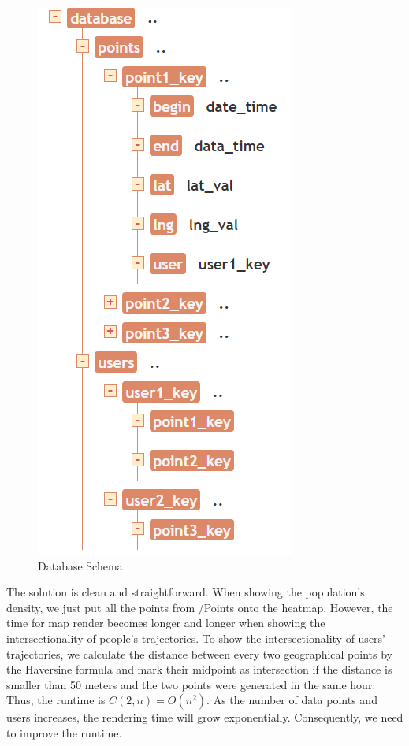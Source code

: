 \documentclass{ucsdreport}
\begin{document}
\begin{figure}[H]
    \includegraphics[scale=0.45]{images/database1.png}
    \caption{Database Schema}
\end{figure}

The solution is clean and straightforward. When showing the population's 
density, we just put all the points from /Points onto the heatmap. However, 
the time for map render becomes longer and longer when showing the 
intersectionality of people's trajectories. To show the intersectionality of 
users' trajectories, we calculate the distance between every two geographical 
points by the Haversine formula and mark their midpoint as intersection if the 
distance is smaller than 50 meters and the two points were generated in the 
same hour. Thus, the runtime is $C(2, n) = O(n^2)$. As the number of data points
and users increases, the rendering time will grow exponentially. Consequently, 
we need to improve the runtime. 
\end{document}
